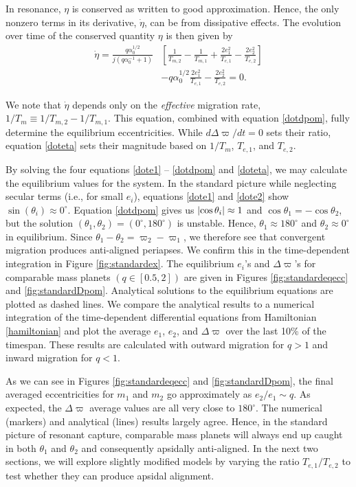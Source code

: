 \documentclass[usenatbib,onecolumn]{mnras}
\DeclarePairedDelimiter{\abs}{|}{|}
\begin{document}
\noindent
In resonance, \(\eta\) is conserved as written to good approximation.
Hence, the only nonzero terms in its derivative, \(\dot{\eta}\),
can be from dissipative effects.
The evolution over time of the conserved quantity \(\eta\) is then given by
\begin{align}
\label{doteta}
  \dot\eta = \frac{q\alpha_0^{1/2}}{j(q\alpha_0^{-1}+1)}&\left[ \frac{1}{T_{m,2}} - \frac{1}{T_{m,1}}
      + \frac{2e_1^2}{T_{e,1}}- \frac{2e_2^2}{T_{e,2}} \right] \nonumber\\
    &- q\alpha_0^{1/2}\frac{2e_1^2}{T_{e,1}} - \frac{2e_2^2}{T_{e,2}}=0.
\end{align}

\noindent We note that \(\dot\eta\) depends only on the
\emph{effective} migration rate, \(1/T_m \equiv 1/T_{m,2} - 1/T_{m,1}\).  This
equation, combined with equation \eqref{dotdpom}, fully determine the
equilibrium eccentricities. While \(d\Delta\varpi/dt=0\) sets their ratio,
equation \eqref{doteta} sets their magnitude based on \(1/T_m\), \(T_{e,1}\),
and \(T_{e,2}\).

By solving the four equations \eqref{dote1} -- \eqref{dotdpom} and
\eqref{doteta}, we may calculate the equilibrium values for the system.
In the standard picture while neglecting secular terms (i.e., for small
\(e_i\)), equations \eqref{dote1} and \eqref{dote2} show
\(\sin(\theta_i)\approx 0^\circ\).  Equation \eqref{dotdpom} gives us
\(\abs{\cos\theta_i} \approx 1\) and \(\cos\theta_1 = -\cos\theta_2\), but
the solution \((\theta_1,\theta_2)=(0^\circ,180^\circ)\) is unstable.  Hence,
\(\theta_1\approx180^\circ\) and \(\theta_2\approx 0^\circ\) in equilibrium.  Since
\(\theta_1-\theta_2 = \varpi_2-\varpi_1\), we therefore see that
convergent migration produces anti-aligned periapses.  We confirm this
in the time-dependent integration in Figure \ref{fig:standardex}.
The equilibrium \(e_i\)'s and \(\Delta\varpi\)'s for comparable mass
planets \((q\in[0.5,2])\) are given in Figures \ref{fig:standardeqecc} and
\ref{fig:standardDpom}.  Analytical solutions to the equilibrium
equations are plotted as dashed lines.
We compare the analytical results to a numerical integration of the 
time-dependent differential equations from Hamiltonian
\eqref{hamiltonian} and plot the average \(e_1\), \(e_2\), and
\(\Delta\varpi\) over the last 10\% of the timespan.  These results are
calculated with outward migration for \(q>1\) and inward migration for
\(q<1\).

As we can see in Figures \ref{fig:standardeqecc} and
\ref{fig:standardDpom}, the final averaged eccentricities for \(m_1\) and
\(m_2\) go approximately as \(e_2/e_1 \sim q\). As expected, the
\(\Delta\varpi\) average values are all very close to \(180^\circ\).  The
numerical (markers) and analytical (lines) results largely agree.
Hence, in the standard picture of resonant capture, comparable mass
planets will always end up caught in both \(\theta_1\) and \(\theta_2\)
and consequently apsidally anti-aligned.  In the next two sections, we
will explore slightly modified models by varying the ratio
\(T_{e,1}/T_{e,2}\) to test whether they can produce apsidal alignment.
\end{document}
